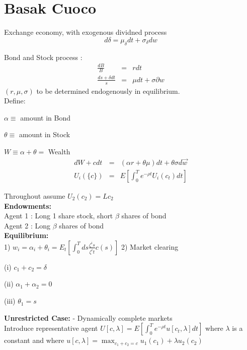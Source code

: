 \documentclass[]{article}
\begin{document}
\section*{Basak Cuoco}
Exchange economy, with exogenous dividned process
\begin{equation*}
d\delta = \mu_\delta dt + \sigma_\delta dw
\end{equation*}

Bond and Stock process :
\begin{eqnarray*}
\frac{dB}{B} &=& rdt\\
\frac{ds+\delta dt}{s} &=& \mu dt + \sigma \partial w
\end{eqnarray*}
$(r, \mu, \sigma) $ to be determined endogenously in equilibrium.\\

Define:
\begin{list}{-}{}
\item $\alpha \equiv$ amount in Bond
\item $\theta \equiv$ amount in Stock
\item $W \equiv \alpha + \theta = $ Wealth
\begin{eqnarray*}
dW + cdt &=& (\alpha r + \theta \mu)dt + \theta \sigma d\vec{w}\\
U_i(\{c\})&=& E\left[\int_0^T e^{-\rho t} U_i(c_t)dt\right]
\end{eqnarray*}
\end{list}

Throughout assume $U_2(c_2) = Lc_2$\\

\textbf{Endowments:}\\
Agent 1 : Long 1 share stock, short $\beta $ shares of bond\\
Agent 2 : Long $\beta $ shares of bond\\

\textbf{Equilibrium:}\\
1) $w_i = \alpha_i + \theta_i = E_t[\int_0^T ds \frac{\zeta^i s}{\zeta^i t} c(s)]$
2) Market clearing
\begin{list}{ }{}
\item (i) $c_1+ c_2 = \delta $
\item (ii) $\alpha_1 + \alpha_2 = 0$
\item (iii) $\theta_1 = s$
\end{list}

\textbf{Unrestricted Case:} - Dynamically complete markets\\
Introduce representative agent $U[c,\lambda] = E[\int_0^T e^{-\rho t} u[c_t, \lambda] dt]$ where $\lambda $ is a constant and where $u[c,\lambda] = \max_{c_1+c_2=c} u_1(c_1) + \lambda u_2 (c_2)$\\
\end{document}
